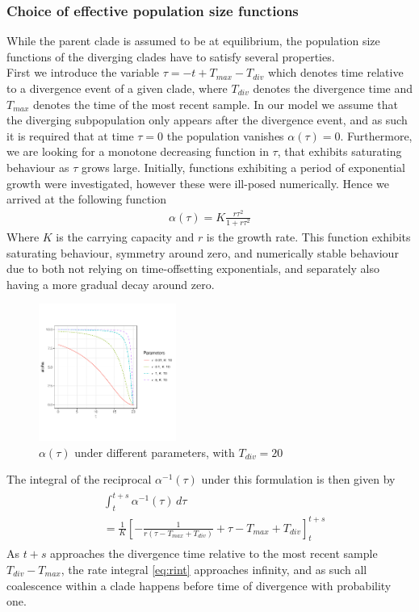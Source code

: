 \documentclass{report}
\theoremstyle{definition}
\begin{document}
\subsubsection{Choice of effective population size functions}
While the parent clade is assumed to be at equilibrium, the population size functions of the diverging clades have to satisfy several properties.\\
First we introduce the variable $\tau = -t + T_{max} - T_{div}$ which denotes time relative to a divergence event of a given clade, where $T_{div}$ denotes the divergence time and $T_{max}$ denotes the time of the most recent sample.
In our model we assume that the diverging subpopulation only appears after the divergence event, and as such it is required that at time $\tau=0$ the population vanishes $\alpha(\tau)=0$. Furthermore, we are looking for a monotone decreasing function in $\tau$, that exhibits saturating behaviour as $\tau$ grows large.
Initially, functions exhibiting a period of exponential growth were investigated, however these were ill-posed numerically.
Hence we arrived at the following function
\begin{gather}
\alpha(\tau) = K\frac{r\tau^2}{1+r\tau^2}
\end{gather} 
Where $K$ is the carrying capacity and $r$ is the growth rate.
This function  exhibits saturating behaviour, symmetry around zero, and numerically stable behaviour due to both not relying on time-offsetting exponentials, and separately also having a more gradual decay around zero.\\
\begin{figure}[H]
  \centering
     \includegraphics[width=0.4\textwidth]{../R/alpha_plots}
    \caption{$\alpha(\tau)$ under different parameters, with $T_{div}=20$}
\end{figure}
The integral of the reciprocal $\alpha^{-1}(\tau)$ under this formulation is then given by 
\begin{gather}
\begin{aligned}\label{eq:rint}
&\int_{t}^{t+s}\alpha^{-1}(\tau)\,d\tau\\ &= \frac{1}{K}\left[-\frac{1}{r(\tau-T_{max}+T_{div})}+\tau-T_{max}+T_{div}\right]_{t}^{t+s}
\end{aligned}
\end{gather}
As $t+s$ approaches the divergence time relative to the most recent sample $T_{div} - T_{max}$, the rate integral \ref{eq:rint} approaches infinity, and as such all coalescence within a clade happens before time of divergence with probability one.
\end{document}
